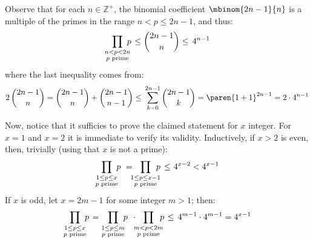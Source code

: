 Observe that for each $n \in \mathbb{Z}^{+}$,
the binomial coefficient $\mbinom{2 n - 1}{n}$ is a multiple of the primes in the range $n < p \leq 2 n - 1$,
and thus:
\begin{equation*}
  \prod\limits_{\underset{\scriptstyle{p \text{ prime}}}{n < p < 2 n}} {\mspace{-10mu} p}  \mspace{2mu}
  \leq \binom{2 n - 1}{n}
  \leq \, 4^{n - 1}
\end{equation*}
where the last inequality comes from:
\begin{equation*}
  2 \, \binom{2 n - 1}{n}
  = \binom{2 n - 1}{n} + \binom{2 n - 1}{n - 1}
  \leq \, \sum\limits_{k = 0}^{2 n - 1} {\binom{2 n - 1}{k}}
  = \paren{1 + 1}^{2 n - 1}
  = 2 \cdot 4^{n - 1}
\end{equation*}

Now, notice that it sufficies to prove the claimed statement for $x$ integer.
For $x = 1$ and $x = 2$ it is immediate to verify its validity.
Inductively, if $x > 2$ is even, then, trivially (using that $x$ is not a prime):
\begin{equation*}
  \prod\limits_{\underset{\scriptstyle{p \text{ prime}}}{1 \leq p \leq x}} {\mspace{-6mu} p}  \mspace{6mu}
  = \mspace{-9mu} \prod\limits_{\underset{\scriptstyle{p \text{ prime}}}{1 \leq p \leq x - 1}} {\mspace{-12mu} p}  \mspace{3mu}
  \leq \mspace{1.2mu} 4^{x - 2}
  < 4^{x - 1}
\end{equation*}
If $x$ is odd, let $x = 2 m - 1$ for some integer $m > 1$; then:
\begin{equation*}
  \prod\limits_{\underset{\scriptstyle{p \text{ prime}}}{1 \leq p \leq x}} {\mspace{-6mu} p}  \mspace{2mu}
  = \prod\limits_{\underset{\scriptstyle{p \text{ prime}}}{1 \leq p \leq m}} {\mspace{-6mu} p}  \mspace{2mu}
    \mspace{6mu} \cdot \mspace{-8mu}
    \prod\limits_{\underset{\scriptstyle{p \text{ prime}}}{m < p < 2 m}} {\mspace{-10mu} p}  \mspace{2mu}
  \leq \, 4^{m - 1} \cdot 4^{m - 1}
  = 4^{x - 1}
\end{equation*}


